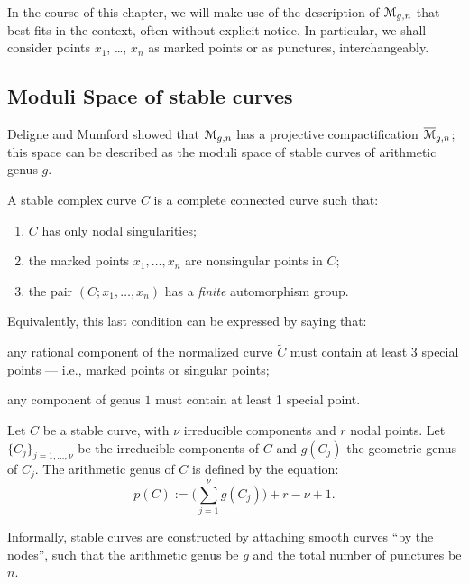 In the course of this chapter, we will make use of the description of
$\mathcal{M}_{g,n}$ that best fits in the context, often without explicit
notice.  In particular, we shall consider points $x_1$, \ldots, $x_n$ as
marked points or as punctures, interchangeably.

\subsection{Moduli Space of stable curves}
\label{sec:moduli-space-stable}

Deligne and Mumford \cite{deligne-mumford} showed that $\mathcal{M}_{g,n}$ has
a projective compactification $\overline{\mathcal{M}}_{g,n}$; this space can be
described as the moduli space of stable curves of arithmetic genus
$g$.
\begin{definition}
  A stable complex curve $C$ is a complete connected curve such that:
  \begin{enumerate}
  \item $C$ has only nodal singularities;
  \item the marked points $x_1, \ldots, x_n$ are nonsingular points in
    $C$;
  \item the pair $(C; x_1, \ldots, x_n)$ has a \emph{finite} automorphism
    group.
  \end{enumerate}
\end{definition}
Equivalently, this last condition can be expressed by saying that:
\begin{inparaenum}[\sl a)]
\item any rational component of the normalized curve $\tilde C$
  must contain at least 3 special points --- i.e., marked points or
  singular points;
\item  any component of genus $1$ must contain
  at least 1 special point.
\end{inparaenum}

Let $C$ be a stable curve, with $\nu$ irreducible components and $r$
nodal points. Let $\{C_j\}_{j=1, \dots, \nu}$ be the irreducible
components of $C$ and $g(C_j)$ the geometric genus of $C_j$.  The
arithmetic genus of $C$ is defined by the equation:
\begin{equation*}
  p(C) := \bigl({\textstyle \sum_{j=1}^\nu} g(C_j) \bigr) + r - \nu + 1.
\end{equation*}

Informally, stable curves are constructed by attaching smooth curves
``by the nodes'', such that the arithmetic genus be $g$ and the total
number of punctures be $n$.



